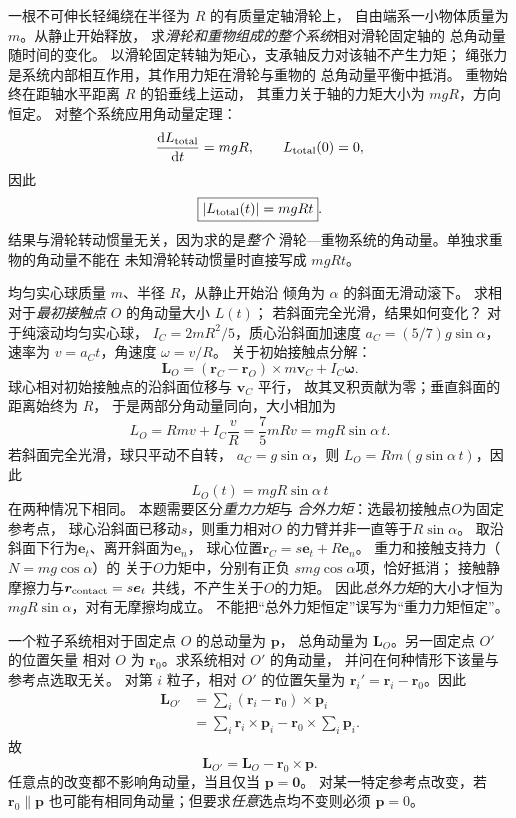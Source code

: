 一根不可伸长轻绳绕在半径为 $R$ 的有质量定轴滑轮上，
自由端系一小物体质量为 $m$。从静止开始释放，
求\emph{滑轮和重物组成的整个系统}相对滑轮固定轴的
总角动量随时间的变化。
\exsolution
以滑轮固定转轴为矩心，支承轴反力对该轴不产生力矩；
绳张力是系统内部相互作用，其作用力矩在滑轮与重物的
总角动量平衡中抵消。
重物始终在距轴水平距离 $R$ 的铅垂线上运动，
其重力关于轴的力矩大小为 $mgR$，方向恒定。
对整个系统应用角动量定理：
\[
\frac{\mathrm dL_{\rm total}}{\mathrm dt}=mgR,
\qquad L_{\rm total}(0)=0,
\]
因此
\[
\boxed{|L_{\rm total}(t)|=mgRt}.
\]
\excheck 结果与滑轮转动惯量无关，因为求的是\emph{整个}
滑轮—重物系统的角动量。单独求重物的角动量不能在
未知滑轮转动惯量时直接写成 $mgRt$。

均匀实心球质量 $m$、半径 $R$，从静止开始沿
倾角为 $\alpha$ 的斜面无滑动滚下。
求相对于\emph{最初接触点} $O$ 的角动量大小 $L(t)$；
若斜面完全光滑，结果如何变化？
\exsolution
对于纯滚动均匀实心球，
$I_C=2mR^2/5$，质心沿斜面加速度
$a_C=(5/7)g\sin\alpha$，
速率为 $v=a_Ct$，角速度 $\omega=v/R$。
关于初始接触点分解：
\[
\bm L_O=(\bm r_C-\bm r_O)\times m\bm v_C
+I_C\bm\omega.
\]
球心相对初始接触点的沿斜面位移与 $\bm v_C$ 平行，
故其叉积贡献为零；垂直斜面的距离始终为 $R$，
于是两部分角动量同向，大小相加为
\[
L_O=Rm v+I_C\frac vR
=\frac75mRv=mgR\sin\alpha\,t.
\]
若斜面完全光滑，球只平动不自转，
$a_C=g\sin\alpha$，则
$L_O=Rm(g\sin\alpha\,t)$，因此
\[
\boxed{L_O(t)=mgR\sin\alpha\,t}
\]
在两种情况下相同。
\excheck 本题需要区分\emph{重力力矩}与
\emph{合外力矩}：选最初接触点$O$为固定参考点，
球心沿斜面已移动$s$，则重力相对$O$
的力臂并非一直等于$R\sin\alpha$。
取沿斜面下行为$\bm e_t$、离开斜面为$\bm e_n$，
球心位置$\bm r_C=s\bm e_t+R\bm e_n$。
重力和接触支持力（$N=mg\cos\alpha$）的
关于$O$力矩中，分别有正负
$s mg\cos\alpha$项，恰好抵消；
接触静摩擦力与$\bm r_{\rm contact}=s\bm e_t$
共线，不产生关于$O$的力矩。
因此\emph{总外力矩}的大小才恒为
$mgR\sin\alpha$，对有无摩擦均成立。
不能把“总外力矩恒定”误写为“重力力矩恒定”。

一个粒子系统相对于固定点 $O$ 的总动量为 $\bm p$，
总角动量为 $\bm L_O$。另一固定点 $O'$ 的位置矢量
相对 $O$ 为 $\bm r_0$。求系统相对 $O'$ 的角动量，
并问在何种情形下该量与参考点选取无关。
\exsolution
对第 $i$ 粒子，相对 $O'$ 的位置矢量为
$\bm r_i'=\bm r_i-\bm r_0$。因此
\[
\begin{aligned}
\bm L_{O'}
&=\sum_i(\bm r_i-\bm r_0)\times\bm p_i\\
&=\sum_i\bm r_i\times\bm p_i
-\bm r_0\times\sum_i\bm p_i.
\end{aligned}
\]
故
\[
\boxed{\bm L_{O'}=\bm L_O-\bm r_0\times\bm p}.
\]
任意点的改变都不影响角动量，当且仅当
$\boxed{\bm p=\bm0}$。
\excheck 对某一特定参考点改变，若 $\bm r_0\parallel\bm p$
也可能有相同角动量；但要求\emph{任意}选点均不变则必须 $\bm p=0$。

